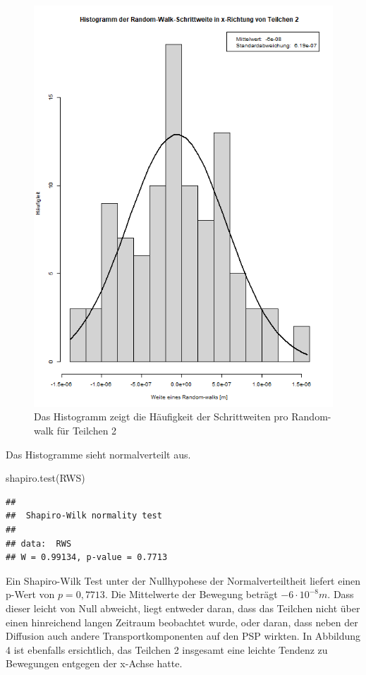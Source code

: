 \documentclass[
  9pt,
]{article}
\newenvironment{Shaded}{\begin{snugshade}}{\end{snugshade}}
\newcommand{\FunctionTok}[1]{\textcolor[rgb]{0.00,0.00,0.00}{#1}}
\newcommand{\NormalTok}[1]{#1}
\begin{document}
\begin{figure}
\centering
\includegraphics[width=\textwidth,height=0.31\textheight]{code/Plots/Teilchen2.png}
\caption{Das Histogramm zeigt die Häufigkeit der Schrittweiten pro
Random-walk für Teilchen 2}
\end{figure}

Das Histogramme sieht normalverteilt aus.

\begin{Shaded}
\begin{Highlighting}[]
\FunctionTok{shapiro.test}\NormalTok{(RWS)}
\end{Highlighting}
\end{Shaded}

\begin{verbatim}
## 
##  Shapiro-Wilk normality test
## 
## data:  RWS
## W = 0.99134, p-value = 0.7713
\end{verbatim}

Ein Shapiro-Wilk Test unter der Nullhypohese der Normalverteiltheit
liefert einen p-Wert von \(p = 0,7713\). Die Mittelwerte der Bewegung
beträgt \(-6\cdot10^{-8}m\). Dass dieser leicht von Null abweicht, liegt
entweder daran, dass das Teilchen nicht über einen hinreichend langen
Zeitraum beobachtet wurde, oder daran, dass neben der Diffusion auch
andere Transportkomponenten auf den PSP wirkten. In Abbildung 4 ist
ebenfalls ersichtlich, das Teilchen 2 insgesamt eine leichte Tendenz zu
Bewegungen entgegen der x-Achse hatte.
\end{document}
